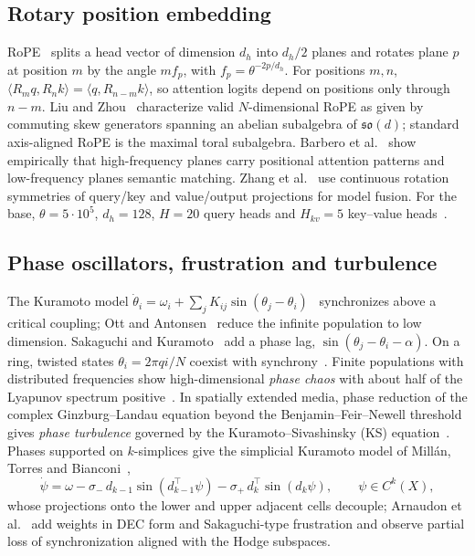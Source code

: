 \documentclass[10pt]{article}
\theoremstyle{definition}
\begin{document}
\subsection{Rotary position embedding}
RoPE~\cite{rope} splits a head vector of dimension $d_h$ into $d_h/2$ planes and rotates plane $p$ at position $m$ by the angle $mf_p$, with $f_p=\theta^{-2p/d_h}$. For positions $m,n$, $\langle R_mq,R_nk\rangle=\langle q,R_{n-m}k\rangle$, so attention logits depend on positions only through $n-m$. Liu and Zhou~\cite{liuzhou} characterize valid $N$-dimensional RoPE as given by commuting skew generators spanning an abelian subalgebra of $\mathfrak{so}(d)$; standard axis-aligned RoPE is the maximal toral subalgebra. Barbero et al.~\cite{barbero} show empirically that high-frequency planes carry positional attention patterns and low-frequency planes semantic matching. Zhang et al.~\cite{zhangrot} use continuous rotation symmetries of query/key and value/output projections for model fusion. For the base, $\theta=5\cdot10^5$, $d_h=128$, $H=20$ query heads and $H_{kv}=5$ key--value heads~\cite{arch,bitnet2b4t}.

\subsection{Phase oscillators, frustration and turbulence}
The Kuramoto model $\dot\theta_i=\omega_i+\sum_jK_{ij}\sin(\theta_j-\theta_i)$~\cite{kuramoto75,kuramoto84,strogatz} synchronizes above a critical coupling; Ott and Antonsen~\cite{ott} reduce the infinite population to low dimension. Sakaguchi and Kuramoto~\cite{sakaguchi} add a phase lag, $\sin(\theta_j-\theta_i-\alpha)$. On a ring, twisted states $\theta_i=2\pi qi/N$ coexist with synchrony~\cite{wiley}. Finite populations with distributed frequencies show high-dimensional \emph{phase chaos} with about half of the Lyapunov spectrum positive~\cite{popovych}. In spatially extended media, phase reduction of the complex Ginzburg--Landau equation beyond the Benjamin--Feir--Newell threshold gives \emph{phase turbulence} governed by the Kuramoto--Sivashinsky (KS) equation~\cite{kuramototsuzuki,sivashinsky,kuramoto84,aransonkramer}. Phases supported on $k$-simplices give the simplicial Kuramoto model of Mill\'an, Torres and Bianconi~\cite{millan},
\begin{equation}\label{e:simpK}
\dot\psi=\omega-\sigma_-\,d_{k-1}\sin(d_{k-1}^{\top}\psi)-\sigma_+\,d_k^{\top}\sin(d_k\psi),\qquad \psi\in C^k(X),
\end{equation}
whose projections onto the lower and upper adjacent cells decouple; Arnaudon et al.~\cite{arnaudon} add weights in DEC form and Sakaguchi-type frustration and observe partial loss of synchronization aligned with the Hodge subspaces.
\end{document}
